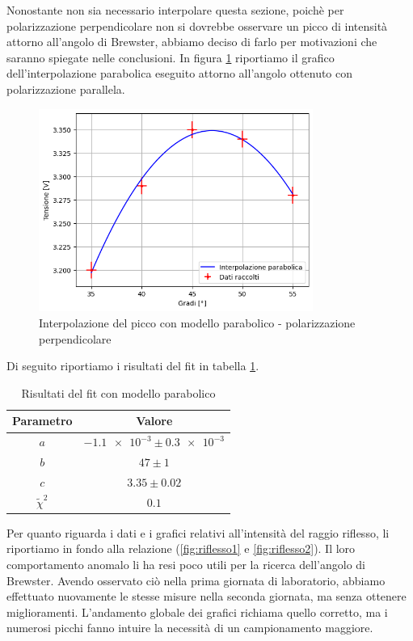 \documentclass[letterpaper,12pt]{article}
\begin{document}
Nonostante non sia necessario interpolare questa sezione, poichè per polarizzazione perpendicolare non si dovrebbe 
osservare un picco di intensità attorno all'angolo di Brewster, abbiamo deciso di farlo per motivazioni che
saranno spiegate nelle conclusioni. In figura \ref{fig:wrong_pol_fit} riportiamo il grafico dell'interpolazione 
parabolica eseguito attorno all'angolo ottenuto con polarizzazione parallela.

\begin{figure}[h]
	\centering
	\includegraphics[width = 0.8\textwidth]{wrong_pol_fit.png}
	\caption{Interpolazione del picco con modello parabolico - polarizzazione perpendicolare}
	\label{fig:wrong_pol_fit}
\end{figure}

Di seguito riportiamo i risultati del fit in tabella \ref{tab:fit_brew_trasmesso_perp}.

\begin{table}[h!]
	\centering
	\begin{tabular}{|c|c|}
		\hline
		\textbf{Parametro} & \textbf{Valore} \\
		\hline
		$a$ & $\num{-1.1e-3} \pm \num{0.3e-3}$ \\
		$b$ & $47 \pm 1$ \\
		$c$ & $3.35 \pm 0.02$ \\
		$\tilde\chi^2$ & $0.1$ \\
		\hline
	\end{tabular}
	\caption{Risultati del fit con modello parabolico}
	\label{tab:fit_brew_trasmesso_perp}
\end{table}

\newpage

Per quanto riguarda i dati e i grafici relativi all'intensità del raggio riflesso, li riportiamo in fondo alla 
relazione (\ref{fig:riflesso1} e \ref{fig:riflesso2}). Il loro comportamento anomalo li ha resi poco utili per la
ricerca dell'angolo di Brewster. Avendo osservato ciò nella prima giornata di laboratorio, 
abbiamo effettuato nuovamente le stesse misure nella seconda giornata, ma senza ottenere miglioramenti. 
L'andamento globale dei grafici richiama quello corretto, ma i numerosi picchi fanno intuire la necessità 
di un campionamento maggiore.\\
\end{document}
